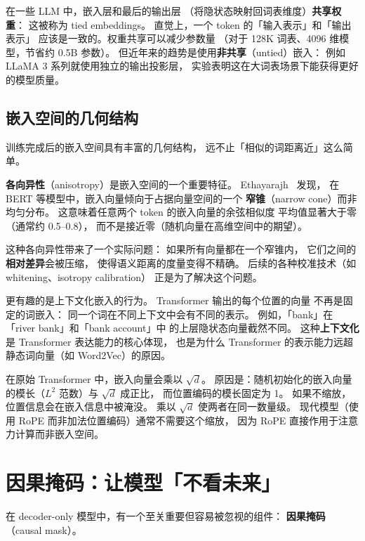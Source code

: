 在一些 LLM 中，嵌入层和最后的输出层
（将隐状态映射回词表维度）\textbf{共享权重}：
这被称为 tied embeddings。
直觉上，一个 token 的「输入表示」和「输出表示」
应该是一致的。权重共享可以减少参数量
（对于 128K 词表、4096 维模型，节省约 0.5B 参数）。
但近年来的趋势是使用\textbf{非共享}（untied）嵌入：
例如 LLaMA 3 系列就使用独立的输出投影层，
实验表明这在大词表场景下能获得更好的模型质量。

\subsection{嵌入空间的几何结构}

训练完成后的嵌入空间具有丰富的几何结构，
远不止「相似的词距离近」这么简单。

\textbf{各向异性}（anisotropy）是嵌入空间的一个重要特征。
Ethayarajh~\cite{ethayarajh2019contextual} 发现，
在 BERT 等模型中，嵌入向量倾向于占据向量空间的一个
\textbf{窄锥}（narrow cone）而非均匀分布。
这意味着任意两个 token 的嵌入向量的余弦相似度
平均值显著大于零（通常约 0.5--0.8），
而不是接近零（随机向量在高维空间中的期望）。

这种各向异性带来了一个实际问题：
如果所有向量都在一个窄锥内，
它们之间的\textbf{相对差异}会被压缩，
使得语义距离的度量变得不精确。
后续的各种校准技术（如 whitening、isotropy calibration）
正是为了解决这个问题。

更有趣的是上下文化嵌入的行为。
Transformer 输出的每个位置的向量
不再是固定的词嵌入：
同一个词在不同上下文中会有不同的表示。
例如，「bank」在「river bank」和「bank account」中
的上层隐状态向量截然不同。
这种\textbf{上下文化}是 Transformer 表达能力的核心体现，
也是为什么 Transformer 的表示能力远超静态词向量（如 Word2Vec）的原因。

\begin{whybox}[嵌入层是否需要缩放？]
在原始 Transformer 中，嵌入向量会乘以 $\sqrt{d}$。
原因是：随机初始化的嵌入向量的模长（$L^2$ 范数）与 $\sqrt{d}$ 成正比，
而位置编码的模长固定为 1。
如果不缩放，位置信息会在嵌入信息中被淹没。
乘以 $\sqrt{d}$ 使两者在同一数量级。
现代模型（使用 RoPE 而非加法位置编码）通常不需要这个缩放，
因为 RoPE 直接作用于注意力计算而非嵌入空间。
\end{whybox}

\section{因果掩码：让模型「不看未来」}

在 decoder-only 模型中，有一个至关重要但容易被忽视的组件：
\textbf{因果掩码}（causal mask）。

